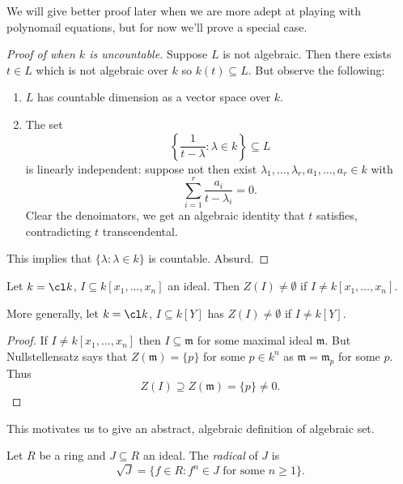 \documentclass[a4paper]{article}
\begin{document}
We will give better proof later when we are more adept at playing with polynomail equations, but for now we'll prove a special case.

\begin{proof}[Proof of  when \(k\) is uncountable]
  Suppose \(L\) is not algebraic. Then there exists \(t \in L\) which is not algebraic over \(k\) so \(k(t) \subseteq L\). But observe the following:
  \begin{enumerate}
  \item \(L\) has countable dimension as a vector space over \(k\).
  \item The set
    \[
      \left\{ \frac{1}{t - \lambda}: \lambda \in k\right\} \subseteq L
    \]
    is linearly independent: suppose not then exist \(\lambda_1, \dots, \lambda_r, a_1, \dots, a_r \in k\) with
    \[
      \sum_{i = 1}^r \frac{a_i}{t - \lambda_i} = 0.
    \]
    Clear the denoimators, we get an algebraic identity that \(t\) satisfies, contradicting \(t\) transcendental.
  \end{enumerate}
  This implies that \(\{\lambda: \lambda \in k\}\) is countable. Absurd.
\end{proof}


\begin{corollary}[Nullstellensatz]
  Let \(k = \cl k\), \(I \subseteq k[x_1, \dots, x_n]\) an ideal. Then \(Z(I) \neq \emptyset\) if \(I \neq k[x_1, \dots, x_n]\).

  More generally, let \(k = \cl k\), \(I \subseteq k[Y]\) has \(Z(I) \neq \emptyset\) if \(I \neq k[Y]\).
\end{corollary}

\begin{proof}
  If \(I \neq k[x_1, \dots, x_n]\) then \(I \subseteq \mathfrak m\) for some maximal ideal \(\mathfrak m\). But Nullstellensatz says that \(Z(\mathfrak m) = \{p\}\) for some \(p \in k^n\) as \(\mathfrak m = \mathfrak m_p\) for some \(p\). Thus
  \[
    Z(I) \supseteq Z(\mathfrak m) = \{p\} \neq 0.
  \]
\end{proof}

This motivates us to give an abstract, algebraic definition of algebraic set.

\begin{definition}[radical]
  Let \(R\) be a ring and \(J \subseteq R\) an ideal. The \emph{radical} of \(J\) is
  \[
    \sqrt J = \{f \in R: f^n \in J \text{ for some } n \geq 1\}.
  \]
\end{definition}
\end{document}
